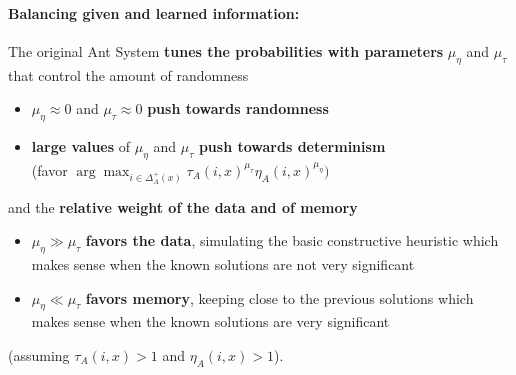 \documentclass[11pt]{article}
\begin{document}
	\paragraph{Balancing given and learned information:} The original Ant System \textbf{tunes the probabilities with parameters} $\mu_{\eta}$ and $\mu_{\tau}$ that control the amount of randomness
	\begin{itemize}
		\item $\mu_{\eta} \approx 0$ and $\mu_{\tau} \approx 0$ \textbf{push towards randomness}
		
		\item \textbf{large values} of $\mu_{\eta}$ and $\mu_{\tau}$ \textbf{push towards determinism} \\
		(favor $\arg \max_{i \in \Delta_A^+ (x)} \tau_A (i, x)^{\mu_{\tau}}  \eta_A (i, x)^{\mu_{\eta}})$
	\end{itemize}
	
	and the \textbf{relative weight of the data and of memory}
	\begin{itemize}
		\item $\mu_{\eta} \gg \mu_{\tau}$ \textbf{favors the data}, simulating the basic constructive heuristic which makes sense when the known solutions are not very significant
		
		\item $\mu_{\eta} \ll \mu_{\tau}$ \textbf{favors memory}, keeping close to the previous solutions which makes sense when the known solutions are very significant
	\end{itemize}
	
	(assuming $\tau_A (i, x) > 1$ and $\eta_A (i, x) > 1$).\\
	
\end{document}
